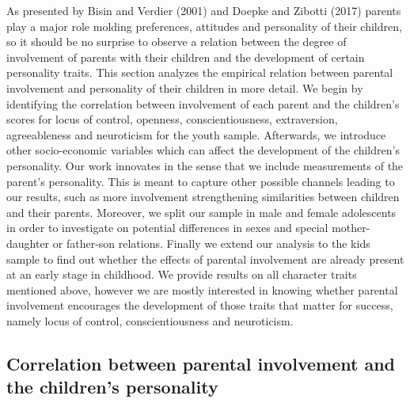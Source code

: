 \documentclass[%
    a4paper,            %
    11pt,               %
    bibliography=totoc, %
]
{scrartcl}
\begin{document}
 As presented by Bisin and Verdier (2001) and Doepke and Zibotti (2017) parents play a major role molding preferences, attitudes and personality of their children, so it should be no surprise to observe a relation between the degree of involvement of parents with their children and the development of certain personality traits. This section analyzes the empirical relation between parental involvement and personality of their children in more detail. We begin by identifying the correlation between involvement of each parent and the children’s scores for locus of control, openness, conscientiousness, extraversion, agreeableness and neuroticism for the youth sample. Afterwards, we introduce other socio-economic variables which can affect the development of the children’s personality. Our work innovates in the sense that we include measurements of the parent’s personality. This is meant to capture other possible channels leading to our results, such as more involvement strengthening similarities between children and their parents. Moreover, we split our sample in male and female adolescents in order to investigate on potential differences in sexes and special mother-daughter or father-son relations. Finally we extend our analysis to the kids sample to find out whether the effects of parental involvement are already present at an early stage in childhood.\newline
We provide results on all character traits mentioned above, however we are mostly interested in knowing whether parental involvement encourages the development of those traits that matter for success, namely locus of control, conscientiousness and neuroticism.


\subsection{Correlation between parental involvement and the children's personality}
\end{document}
